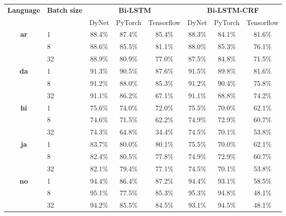 \begin{table}[h]
    \centering
    \begin{tabular}{c l c c c|c c c}
        \toprule
        \multirow{2}{*}{\bfseries Language} &
        \multirow{2}{*}{\bfseries Batch size} &
        \multicolumn{3}{c}{\bfseries Bi-LSTM} &
        \multicolumn{3}{c}{\bfseries Bi-LSTM-CRF} \\
        \cmidrule(lr){3-8}
        && DyNet & PyTorch & Tensorflow & DyNet & PyTorch & Tensorflow \\

        \cmidrule(lr){1-8}
        \multirow{3}{*}{\bfseries ar}
        &  1 & 88.4\% & 87.4\% & 85.4\% & 88.3\% & 84.1\% & 81.6\% \\
        &  8 & 88.6\% & 85.5\% & 81.1\% & 88.0\% & 85.3\% & 76.1\% \\
        & 32 & 88.9\% & 80.9\% & 77.0\% & 87.5\% & 84.8\% & 71.5\% \\

        \cmidrule(lr){1-8}
        \multirow{3}{*}{\bfseries da}
        &  1 & 91.3\% & 90.5\% & 87.6\% & 91.5\% & 89.8\% & 81.6\% \\
        &  8 & 91.2\% & 88.0\% & 85.3\% & 91.2\% & 90.4\% & 75.8\% \\
        & 32 & 91.1\% & 86.2\% & 67.1\% & 91.1\% & 88.8\% & 74.2\% \\

        \cmidrule(lr){1-8}
        \multirow{3}{*}{\bfseries hi}
        &  1 & 75.6\% & 74.0\% & 72.0\% & 75.5\% & 70.0\% & 62.1\% \\
        &  8 & 74.6\% & 71.5\% & 62.2\% & 74.9\% & 72.9\% & 60.7\% \\
        & 32 & 74.3\% & 64.8\% & 34.4\% & 74.5\% & 70.1\% & 53.8\% \\

        \cmidrule(lr){1-8}
        \multirow{3}{*}{\bfseries ja}
        &  1 & 83.7\% & 80.0\% & 80.1\% & 75.5\% & 70.0\% & 62.1\% \\
        &  8 & 82.4\% & 80.5\% & 77.8\% & 74.9\% & 72.9\% & 60.7\% \\
        & 32 & 82.1\% & 79.4\% & 77.1\% & 74.5\% & 70.1\% & 53.8\% \\

        \cmidrule(lr){1-8}
        \multirow{3}{*}{\bfseries no}
        &  1 & 94.4\% & 86.4\% & 87.2\% & 94.4\% & 93.1\% & 58.5\% \\
        &  8 & 95.1\% & 77.5\% & 85.3\% & 95.3\% & 94.8\% & 48.1\% \\
        & 32 & 94.2\% & 85.5\% & 84.5\% & 93.1\% & 94.5\% & 48.1\% \\


\end{tabular}
\end{table}
